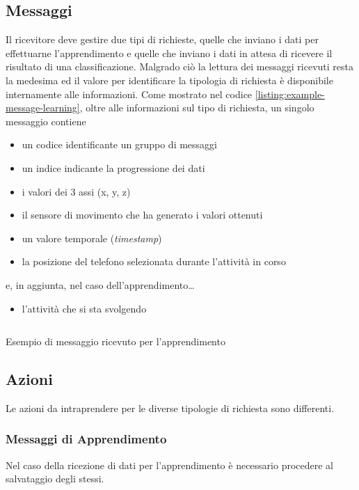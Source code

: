 \subsection{Messaggi}
Il ricevitore deve gestire due tipi di richieste, quelle che inviano i dati per effettuarne l'apprendimento e quelle che inviano
i dati in attesa di ricevere il risultato di una classificazione. Malgrado ciò la lettura dei messaggi ricevuti resta la medesima ed il 
valore per identificare la tipologia di richiesta è disponibile internamente alle informazioni.
\vspace{5mm} %
\newline
Come mostrato nel codice \ref{listing:example-message-learning}, oltre alle informazioni sul tipo di richiesta, un singolo messaggio contiene 
\begin{itemize}
    \item un codice identificante un gruppo di messaggi
    \item un indice indicante la progressione dei dati
    \item i valori dei 3 assi (x, y, z)
    \item il sensore di movimento che ha generato i valori ottenuti
    \item un valore temporale (\textit{timestamp})
    \item la posizione del telefono selezionata durante l'attività in corso
\end{itemize}
e, in aggiunta, nel caso dell'apprendimento\dots
\begin{itemize}
    \item l'attività che si sta svolgendo
\end{itemize}

\begin{listing}[H] 
    \inputminted[frame=single,framesep=10pt]{json}{assets/snippets/server/receiver/message.json}
    \caption{Esempio di messaggio ricevuto per l'apprendimento}
    \label{listing:example-message-learning}
\end{listing}

\newpage
\subsection{Azioni}
Le azioni da intraprendere per le diverse tipologie di richiesta sono differenti. 

\subsubsection{Messaggi di Apprendimento}
Nel caso della ricezione di dati per l'apprendimento è necessario procedere al salvataggio degli stessi.

